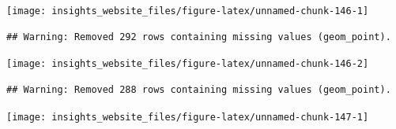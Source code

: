 \documentclass[]{book}
\newenvironment{Shaded}{\begin{snugshade}}{\end{snugshade}}
\newcommand{\DataTypeTok}[1]{\textcolor[rgb]{0.13,0.29,0.53}{#1}}
\newcommand{\FloatTok}[1]{\textcolor[rgb]{0.00,0.00,0.81}{#1}}
\newcommand{\KeywordTok}[1]{\textcolor[rgb]{0.13,0.29,0.53}{\textbf{#1}}}
\newcommand{\NormalTok}[1]{#1}
\newcommand{\OperatorTok}[1]{\textcolor[rgb]{0.81,0.36,0.00}{\textbf{#1}}}
\newcommand{\StringTok}[1]{\textcolor[rgb]{0.31,0.60,0.02}{#1}}
\begin{document}
\begin{center}\texttt{[image: insights\_website\_files/figure-latex/unnamed-chunk-146-1]} \end{center}

\begin{Shaded}
\end{Shaded}

\begin{verbatim}
## Warning: Removed 292 rows containing missing values (geom_point).
\end{verbatim}

\begin{center}\texttt{[image: insights\_website\_files/figure-latex/unnamed-chunk-146-2]} \end{center}

\begin{Shaded}
\end{Shaded}

\begin{verbatim}
## Warning: Removed 288 rows containing missing values (geom_point).
\end{verbatim}

\begin{center}\texttt{[image: insights\_website\_files/figure-latex/unnamed-chunk-147-1]} \end{center}
\end{document}
